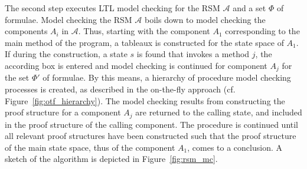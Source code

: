 \documentclass[a4paper, 12pt, twoside]{report}
\begin{document}
	The second step executes LTL model checking for the RSM $\mathcal{A}$ and a set $\Phi$ of formulae. Model checking the RSM $\mathcal{A}$ boils down to model checking the components $A_i$ in $\mathcal{A}$. Thus, starting with the component $A_1$ corresponding to the main method of the program, a tableaux is constructed for the state space of $A_1$. If during the construction, a state $s$ is found that invokes a method $j$, the according box is entered and model checking is continued for component $A_j$ for the set $\Phi'$ of formulae. By this means, a hierarchy of procedure model checking processes is created, as described in the on-the-fly approach (cf. Figure~\ref{fig:otf_hierarchy}). The model checking results from constructing the proof structure for a component $A_j$ are returned to the calling state, and included in the proof structure of the calling component. The procedure is continued until all relevant proof structures have been constructed such that the proof structure of the main state space, thus of the component $A_1$, comes to a conclusion. A sketch of the algorithm is depicted in Figure~\ref{fig:rsm_mc}.\\
	
\end{document}
